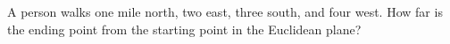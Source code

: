 A person walks one mile north, two east, three south, and four west. How far is the ending point from the starting point in the Euclidean plane?
